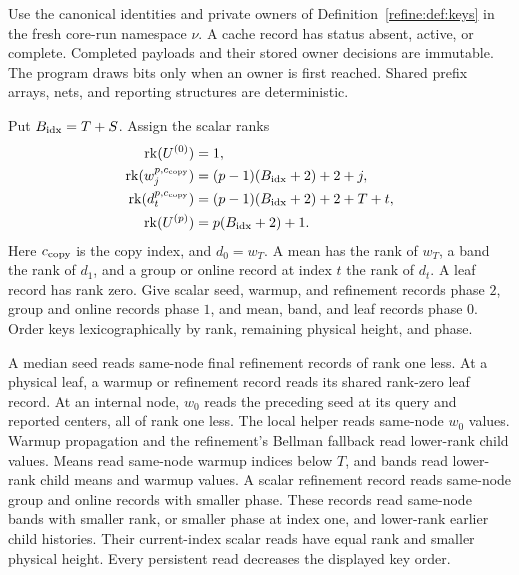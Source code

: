 \documentclass[11pt]{article}
\theoremstyle{definition}
\newcommand{\1}{\mathbf 1}
\begin{document}
Use the canonical identities and private owners of
Definition~\ref{refine:def:keys} in the fresh core-run namespace $\nu$.
A cache record has status absent, active, or complete.
Completed payloads and their stored owner decisions are immutable.
The program draws bits only when an owner is first reached.
Shared prefix arrays, nets, and reporting structures are deterministic.

Put $B_{\rm idx}=T+S$. Assign the scalar ranks
\begin{align*}
 \operatorname{rk}(U^{(0)})&=1,\\
 \operatorname{rk}(w_j^{p,c_{\rm copy}})
   &=(p-1)(B_{\rm idx}+2)+2+j,\\
 \operatorname{rk}(d_t^{p,c_{\rm copy}})
   &=(p-1)(B_{\rm idx}+2)+2+T+t,\\
 \operatorname{rk}(U^{(p)})&=p(B_{\rm idx}+2)+1.
\end{align*}
Here $c_{\rm copy}$ is the copy index, and $d_0=w_T$.
A mean has the rank of $w_T$, a band the rank of $d_1$, and a group
or online record at index $t$ the rank of $d_t$.
A leaf record has rank zero.
Give scalar seed, warmup, and refinement records phase $2$,
group and online records phase $1$, and mean, band, and leaf records
phase $0$.
Order keys lexicographically by rank, remaining physical height, and
phase.

A median seed reads same-node final refinement records of rank one less.
At a physical leaf, a warmup or refinement record reads its shared
rank-zero leaf record. At an internal node, $w_0$ reads the preceding
seed at its query and reported centers, all of rank one less.
The local helper reads same-node $w_0$ values. Warmup propagation and
the refinement's Bellman fallback read lower-rank child values.
Means read same-node warmup indices below $T$, and bands read lower-rank
child means and warmup values.
A scalar refinement record reads same-node group and online records
with smaller phase. These records read same-node bands with smaller
rank, or smaller phase at index one, and lower-rank earlier child
histories. Their current-index scalar reads have equal rank and smaller
physical height. Every persistent read decreases the displayed key order.
\end{document}
